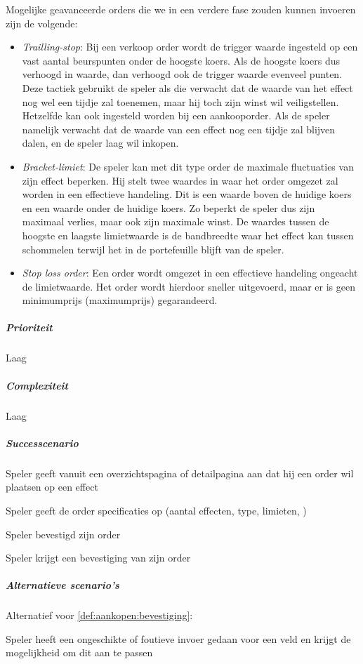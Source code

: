 \begin{compact}
Mogelijke geavanceerde orders die we in een verdere fase zouden kunnen invoeren zijn de volgende:
\begin{itemize}
	\item \emph{Trailling-stop}: Bij een verkoop order wordt de trigger waarde ingesteld op een vast aantal beurspunten onder de hoogste koers. Als de hoogste koers dus verhoogd in waarde, dan verhoogd ook de trigger waarde evenveel punten. Deze tactiek gebruikt de speler als die verwacht dat de waarde van het effect nog wel een tijdje zal toenemen, maar hij toch zijn winst wil veiligstellen. Hetzelfde kan ook ingesteld worden bij een aankooporder. Als de speler namelijk verwacht dat de waarde van een effect nog een tijdje zal blijven dalen, en de speler laag wil inkopen.
  \item \emph{Bracket-limiet}: De speler kan met dit type order de maximale fluctuaties van zijn effect beperken. Hij stelt twee waardes in waar het order omgezet zal worden in een effectieve handeling. Dit is een waarde boven de huidige koers en een waarde onder de huidige koers. Zo beperkt de speler dus zijn maximaal verlies, maar ook zijn maximale winst. De waardes tussen de hoogste en laagste limietwaarde is de bandbreedte waar het effect kan tussen schommelen terwijl het in de portefeuille blijft van de speler.
  \item \emph{Stop loss order}: Een order wordt omgezet in een effectieve handeling ongeacht de limietwaarde. Het order wordt hierdoor sneller uitgevoerd, maar er is geen minimumprijs (maximumprijs) gegarandeerd.
\end{itemize}
\subparagraph{Prioriteit}Laag
\subparagraph{Complexiteit}Laag
\subparagraph{Successcenario}
\begin{enumerate_compact}
 \item Speler geeft vanuit een overzichtspagina of detailpagina aan dat hij een order wil plaatsen op een effect
 \item Speler geeft de order specificaties op (aantal effecten, type, limieten, )
 \item Speler bevestigd zijn order
 \item \label{def:aankopen:bevestiging} Speler krijgt een bevestiging van zijn order
\end{enumerate_compact}
\subparagraph{Alternatieve scenario's}
Alternatief voor \ref{def:aankopen:bevestiging}:
\begin{enumerate_compact}
 \item Speler heeft een ongeschikte of foutieve invoer gedaan voor een veld en krijgt de mogelijkheid om dit aan te passen
\end{enumerate_compact}
\end{compact}

